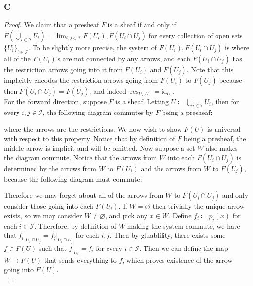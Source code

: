 \documentclass{article}
\newcommand{\id}{\mathrm{id}}
\newcommand{\fI}{\mathscr{I}}
\DeclareMathOperator{\res}{\mathrm{res}}
\let\emptyset\varnothing
\begin{document}
\subsubsection{C}\label{2.2.C}
\begin{proof}
    We claim that a presheaf $F$ is a sheaf if and only if $F(\bigcup_{i\in \fI}U_i)=\lim_{i,j\in \fI} F(U_i),F(U_i\cap U_j)$ for every collection of open sets $\{U_i\}_{i\in \fI}$. To be slightly more precise, the system of $F(U_i),F(U_i\cap U_j)$ is where all of the $F(U_i)$'s are not connected by any arrows, and each $F(U_i\cap U_j)$ has the restriction arrows going into it from $F(U_i)$ and $F(U_j)$. Note that this implicitly encodes the restriction arrows going from $F(U_i)$ to $F(U_j)$ because then $F(U_i\cap U_j)=F(U_j)$, and indeed $\res_{U_i,U_i}=\id_{U_i}$.\\
    For the forward direction, suppose $F$ is a sheaf. Letting $U\coloneqq \bigcup_{i\in \fI} U_i$, then for every $i,j\in \fI$, the following diagram commutes by $F$ being a presheaf:
   \begin{center}
   \end{center}
   where the arrows are the restrictions. We now wish to show $F(U)$ is universal with respect to this property. Notice that by definition of $F$ being a presheaf, the middle arrow is implicit and will be omitted. Now suppose a set $W$ also makes the diagram commute. Notice that the arrows from $W$ into each $F(U_i\cap U_j)$ is determined by the arrows from $W$ to $F(U_i)$ and the arrows from $W$ to $F(U_j)$, because the following diagram must commute:
   \begin{center}
   \end{center}
   Therefore we may forget about all of the arrows from $W$ to $F(U_i\cap U_j)$ and only consider those going into each $F(U_i)$. If $W=\emptyset$ then trivially the unique arrow exists, so we may consider $W\ne \emptyset$, and pick any $x\in W$. Define $f_i\coloneqq p_i(x)$ for each $i\in \fI$. Therefore, by definition of $W$ making the system commute, we have that $f_i\vert_{U_i\cap U_j}=f_j\vert_{U_i\cap U_j}$ for each $i,j$. Then by gluablility, there exists some $f\in F(U)$ such that $f\vert_{U_i}=f_i$ for every $i\in \fI$. Then we can define the map $W\to F(U)$ that sends everything to $f$, which proves existence of the arrow going into $F(U)$.\\

\end{proof}
\end{document}
